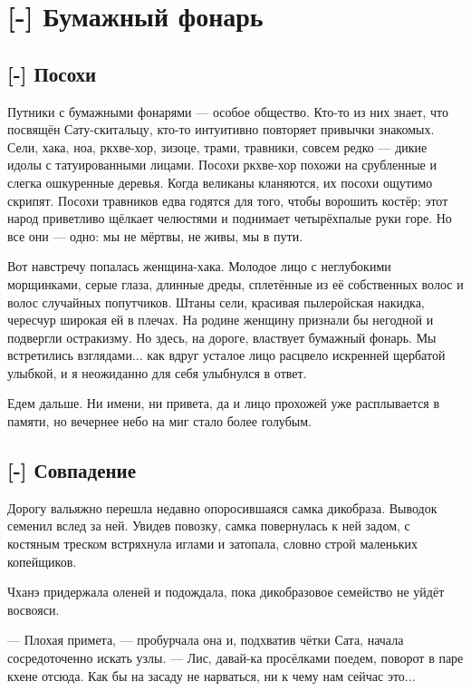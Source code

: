\chapter{[-] Бумажный фонарь}

\section{[-] Посохи}

Путники с бумажными фонарями --- особое общество.
Кто-то из них знает, что посвящён Сату-скитальцу, кто-то интуитивно повторяет привычки знакомых.
Сели, хака, ноа, ркхве-хор, зизоце, трами, травники, совсем редко --- дикие идолы с татуированными лицами.
Посохи ркхве-хор похожи на срубленные и слегка ошкуренные деревья.
Когда великаны кланяются, их посохи ощутимо скрипят.
Посохи травников едва годятся для того, чтобы ворошить костёр;
этот народ приветливо щёлкает челюстями и поднимает четырёхпалые руки горе.
Но все они --- одно: мы не мёртвы, не живы, мы в пути.

Вот навстречу попалась женщина-хака.
Молодое лицо с неглубокими морщинками, серые глаза, длинные дреды, сплетённые из её собственных волос и волос случайных попутчиков.
Штаны сели, красивая пылеройская накидка, чересчур широкая ей в плечах.
На родине женщину признали бы негодной и подвергли остракизму.
Но здесь, на дороге, властвует бумажный фонарь.
Мы встретились взглядами... как вдруг усталое лицо расцвело искренней щербатой улыбкой, и я неожиданно для себя улыбнулся в ответ.

Едем дальше.
Ни имени, ни привета, да и лицо прохожей уже расплывается в памяти, но вечернее небо на миг стало более голубым.

\section{[-] Совпадение}

\textspace

Дорогу вальяжно перешла недавно опоросившаяся самка дикобраза.
Выводок семенил вслед за ней.
Увидев повозку, самка повернулась к ней задом, с костяным треском встряхнула иглами и затопала, словно строй маленьких копейщиков.

Чханэ придержала оленей и подождала, пока дикобразовое семейство не уйдёт восвояси.

--- Плохая примета, --- пробурчала она и, подхватив чётки Сата, начала сосредоточенно искать узлы.
--- Лис, давай-ка просёлками поедем, поворот в паре кхене отсюда.
Как бы на засаду не нарваться, ни к чему нам сейчас это...

